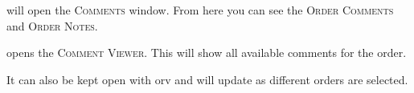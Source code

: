  will open the \textsc{Comments} window. From here you can see the \textsc{Order Comments} and \textsc{Order Notes}.

 opens the \textsc{Comment Viewer}. This will show all available comments for the order.

It can also be kept open with \gls{orv} and will update as different orders are selected.

